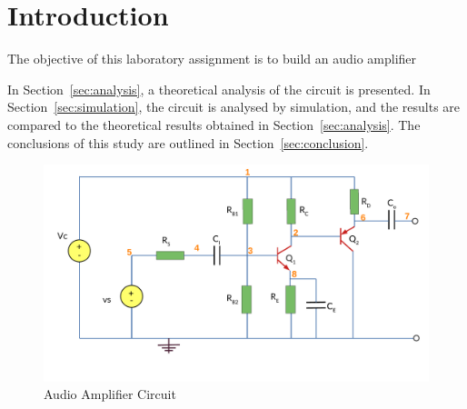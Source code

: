 \section{Introduction}
\label{sec:introduction}

The objective of this laboratory assignment is to build an audio amplifier

In Section~\ref{sec:analysis}, a theoretical analysis of the circuit is
presented. In Section~\ref{sec:simulation}, the circuit is analysed by
simulation, and the results are compared to the theoretical results obtained in
Section~\ref{sec:analysis}. The conclusions of this study are outlined in
Section~\ref{sec:conclusion}.

\begin{figure}[H] \centering
\includegraphics[width=1\linewidth]{../t4circuit.pdf}
\caption{Audio Amplifier Circuit}
\label{fig:t4}
\end{figure}


